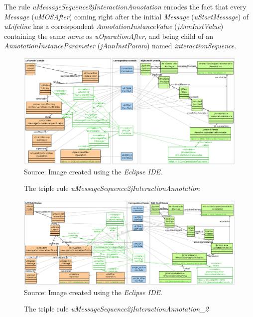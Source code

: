 \documentclass[tuberlin,cic,tc,english,noabntcite,oneside]{iiufrgs}
\begin{document}
The rule \emph{uMessageSequence2jInteractionAnnotation} encodes the fact that every \emph{Message} (\emph{uMOSAfter}) coming right after the initial \emph{Message} (\emph{uStartMessage}) of \emph{uLifeline} has a correspondent \emph{AnnotationInstanceValue} (\emph{jAnnInstValue}) containing the same \emph{name} as \emph{uOparationAfter}, and being child of an \emph{AnnotationInstanceParameter} (\emph{jAnnInstParam}) named \emph{interactionSequence}.

\begin{figure}[H]
	\centering
    \caption{The triple rule \emph{uMessageSequence2jInteractionAnnotation}}
    \includegraphics[width=\textwidth]{uMessageSequence2jInteractionAnnotation} \\
    Source: Image created using the \emph{Eclipse IDE}.
    \label{fig:uMessageSequence2jInteractionAnnotation}
\end{figure}

\begin{figure}[H]
	\centering
    \caption{The triple rule \emph{uMessageSequence2jInteractionAnnotation\_2}}
    \includegraphics[width=\textwidth]{uMessageSequence2jInteractionAnnotation_2} \\
    Source: Image created using the \emph{Eclipse IDE}.
    \label{fig:uMessageSequence2jInteractionAnnotation_2}
\end{figure}
\end{document}
